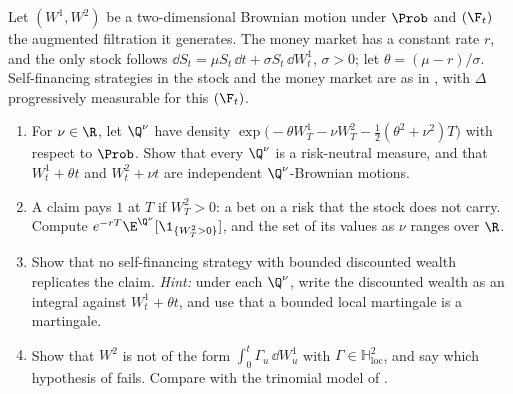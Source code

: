 \begin{exercise}\label{ex:rn-incomplete}
\hard Let $(W^1,W^2)$ be a two-dimensional Brownian motion under $\Prob$ and $(\F_t)$ the
augmented filtration it generates. The money market has a constant rate $r$, and the only
stock follows $\dd S_t=\mu S_t\,\dd t+\sigma S_t\,\dd W^1_t$, $\sigma>0$; let
$\theta=(\mu-r)/\sigma$. Self-financing strategies in the stock and the money market are as in
, with $\Delta$ progressively measurable for this $(\F_t)$.
\begin{enumerate}[label=(\alph*)]
  \item For $\nu\in\R$, let $\Q^\nu$ have density
    $\exp\big(-\theta W^1_T-\nu W^2_T-\frac12(\theta^2+\nu^2)T\big)$ with respect to $\Prob$.
    Show that every $\Q^\nu$ is a risk-neutral measure, and that $W^1_t+\theta t$ and
    $W^2_t+\nu t$ are independent $\Q^\nu$-Brownian motions.
  \item A claim pays $1$ at $T$ if $W^2_T>0$: a bet on a risk that the stock does not carry.
    Compute $e^{-rT}\E^{\Q^\nu}[\1_{\{W^2_T>0\}}]$, and the set of its values as $\nu$ ranges
    over $\R$.
  \item Show that no self-financing strategy with bounded discounted wealth replicates the
    claim. \emph{Hint:} under each $\Q^\nu$, write the discounted wealth as an integral against
    $W^1_t+\theta t$, and use that a bounded local martingale is a martingale.
  \item Show that $W^2$ is not of the form $\int_0^t\Gamma_u\,\dd W^1_u$ with $\Gamma\in\mathbb
    H^2_{\mathrm{loc}}$, and say which hypothesis of  fails.
    Compare with the trinomial model of .
\end{enumerate}
\end{exercise}

